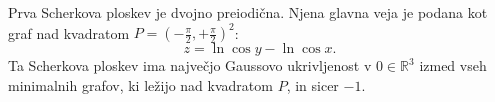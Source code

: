 \documentclass[8pt]{beamer}
\theoremstyle{definition}
\theoremstyle{remark}
\theoremstyle{plain}
\numberwithin{equation}{section}  %
\begin{document}
\begin{frame}
\begin{columns}
        \begin{column}{0.5\textwidth}
            Prva Scherkova ploskev je dvojno preiodična. Njena glavna veja je podana kot graf nad kvadratom $P=\left(-\frac{\pi}{2}, +\frac{\pi}{2}\right)^2$:
            \begin{equation*}
                z = \ln{\cos{y}} - \ln{\cos{x}}.
            \end{equation*}
            \pause
            Ta Scherkova ploskev ima največjo Gaussovo ukrivljenost v $0\in \mathbb{R}^3$ izmed vseh minimalnih grafov, ki ležijo nad kvadratom $P$, in sicer $-1$. 

            \vspace{0.8em}


\end{column}
\end{columns}
\end{frame}
\end{document}
